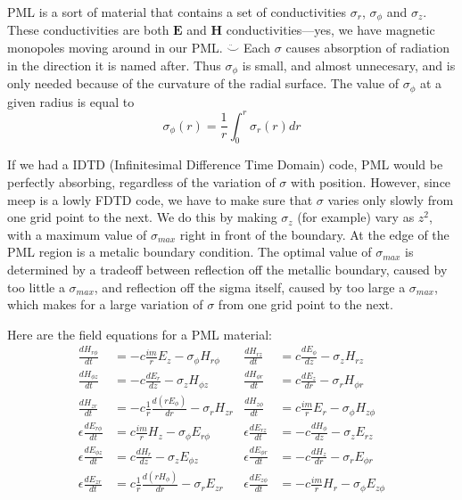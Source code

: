 \documentclass[floats]{book}
\begin{document}
PML is a sort of material that contains a set of conductivities $\sigma_r$,
$\sigma_\phi$ and $\sigma_z$.  These conductivities are both $\mathbf{E}$
and $\mathbf{H}$ conductivities---yes, we have magnetic monopoles moving
around in our PML.  $\ddot\smile$ Each $\sigma$ causes absorption of
radiation in the direction it is named after.  Thus $\sigma_\phi$ is small,
and almost unnecesary, and is only needed because of the curvature of the
radial surface.  The value of $\sigma_\phi$ at a given radius is equal to
\begin{equation}
\sigma_\phi(r) = \frac1r \int_0^r \sigma_r(r)dr
\end{equation}

If we had a IDTD (Infinitesimal Difference Time Domain) code, PML would be
perfectly absorbing, regardless of the variation of $\sigma$ with position.
However, since meep is a lowly FDTD code, we have to make sure that
$\sigma$ varies only slowly from one grid point to the next.  We do this by
making $\sigma_z$ (for example) vary as $z^2$, with a maximum value of
$\sigma_{max}$ right in front of the boundary.  At the edge of the PML
region is a metalic boundary condition.  The optimal value of
$\sigma_{max}$ is determined by a tradeoff between reflection off the
metallic boundary, caused by too little a $\sigma_{max}$, and reflection
off the sigma itself, caused by too large a $\sigma_{max}$, which makes for
a large variation of $\sigma$ from one grid point to the next.

Here are the field equations for a PML material:
\begin{align}
\frac{dH_{r\phi}}{dt} &= - c \frac{im}r E_z             - \sigma_\phi H_{r\phi} &
\frac{dH_{rz}}{dt} &= c \frac{dE_\phi}{dz}              - \sigma_z H_{rz}\\
\frac{dH_{\phi z}}{dt} &= - c \frac{dE_r}{dz}           - \sigma_z H_{\phi z} &
\frac{dH_{\phi r}}{dt} &= c \frac{dE_z}{dr}             - \sigma_r H_{\phi r} \\
\frac{dH_{zr}}{dt} &= - c \frac1r\frac{d(rE_\phi)}{dr}  - \sigma_r H_{zr}  &
\frac{dH_{z\phi}}{dt} &= c \frac{im}r E_r               - \sigma_\phi H_{z\phi} \\
\epsilon\frac{dE_{r\phi}}{dt} &=   c \frac{im}r H_z             - \sigma_\phi E_{r\phi} &
\epsilon\frac{dE_{rz}}{dt} &= -c\frac{dH_\phi}{dz}              - \sigma_z E_{rz}\\
\epsilon\frac{dE_{\phi z}}{dt} &=   c \frac{dH_r}{dz}           - \sigma_z E_{\phi z} &
\epsilon\frac{dE_{\phi r}}{dt} &=-c \frac{dH_z}{dr}             - \sigma_r E_{\phi r} \\
\epsilon\frac{dE_{zr}}{dt} &=   c \frac1r\frac{d(rH_\phi)}{dr}  - \sigma_r E_{zr}  &
\epsilon\frac{dE_{z\phi}}{dt} &=-c \frac{im}r H_r               - \sigma_\phi E_{z\phi} 
\end{align}
\end{document}
